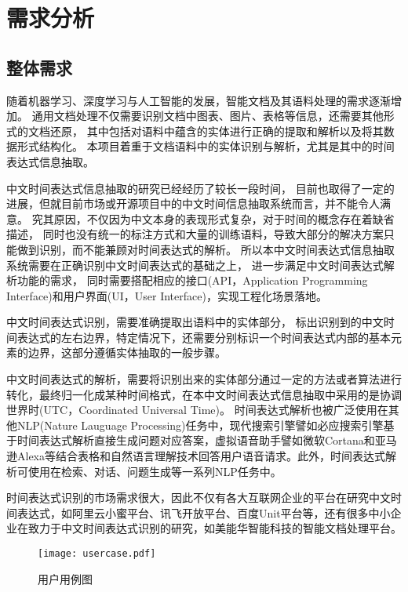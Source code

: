 
\chapter{需求分析}

\section{整体需求}

随着机器学习、深度学习与人工智能的发展，智能文档及其语料处理的需求逐渐增加。
通用文档处理不仅需要识别文档中图表、图片、表格等信息，还需要其他形式的文档还原，
其中包括对语料中蕴含的实体进行正确的提取和解析以及将其数据形式结构化。
本项目着重于文档语料中的实体识别与解析，尤其是其中的时间表达式信息抽取。

中文时间表达式信息抽取的研究已经经历了较长一段时间，
目前也取得了一定的进展，但就目前市场或开源项目中的中文时间信息抽取系统而言，并不能令人满意。
究其原因，不仅因为中文本身的表现形式复杂，对于时间的概念存在着缺省描述，
同时也没有统一的标注方式和大量的训练语料，导致大部分的解决方案只能做到识别，而不能兼顾对时间表达式的解析。
所以本中文时间表达式信息抽取系统需要在正确识别中文时间表达式的基础之上，
进一步满足中文时间表达式解析功能的需求，
同时需要搭配相应的接口(API，Application Programming Interface)和用户界面(UI，User Interface)，实现工程化场景落地。

中文时间表达式识别，需要准确提取出语料中的实体部分，
标出识别到的中文时间表达式的左右边界，特定情况下，还需要分别标识一个时间表达式内部的基本元素的边界，这部分遵循实体抽取的一般步骤。

中文时间表达式的解析，需要将识别出来的实体部分通过一定的方法或者算法进行转化，最终归一化成某种时间格式，在本中文时间表达式信息抽取中采用的是协调世界时(UTC，Coordinated Universal Time)。
时间表达式解析也被广泛使用在其他NLP(Nature Lauguage Processing)任务中，现代搜索引擎譬如必应搜索引擎基于时间表达式解析直接生成问题对应答案，虚拟语音助手譬如微软Cortana和亚马逊Alexa等结合表格和自然语言理解技术回答用户语音请求。此外，时间表达式解析可使用在检索、对话、问题生成等一系列NLP任务中。

时间表达式识别的市场需求很大，因此不仅有各大互联网企业的平台在研究中文时间表达式，如阿里云小蜜平台、讯飞开放平台、百度Unit平台等，还有很多中小企业在致力于中文时间表达式识别的研究，如美能华智能科技的智能文档处理平台。

\begin{figure}[h]
    \centering
    \texttt{[image: usercase.pdf]}
    \caption{用户用例图}
    \label{fig:usecase}
\end{figure}

